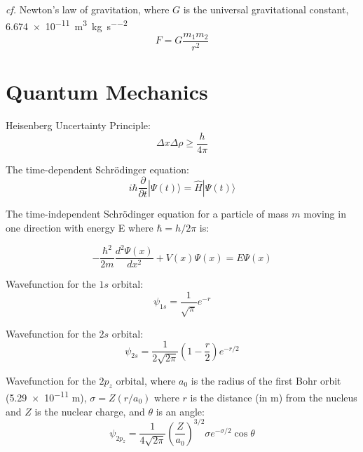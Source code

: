 \documentclass[10pt]{article}
\begin{document}
\textit{cf.} Newton's law of gravitation, where $G$ is the universal gravitational constant, \num{6.674e-11}~\si{\cubic\meter\per\kg\per\second\squared}
\begin{equation*}
F = G\frac{m_1m_2}{r^2}
\end{equation*}

\newpage
\section{Quantum Mechanics}

Heisenberg Uncertainty Principle:
\begin{equation*}
\Delta x \Delta\rho \ge \frac{h}{4\pi}
\end{equation*}

The time-dependent Schr\"odinger equation:
\begin{equation*}
i\hbar\frac{\partial}{\partial t}|\Psi(t)\rangle = \hat{H}|\Psi(t)\rangle
\end{equation*}

The time-independent Schr\"odinger equation for a particle of mass $m$ moving in one direction with energy E where $\hbar=h/2\pi$ is:

\begin{equation*}
-\frac{\hbar^2}{2m}\frac{d^2\Psi(x)}{dx^2}+V(x)\Psi(x)=E\Psi(x)
\end{equation*}

Wavefunction for the $1s$ orbital:
\begin{equation*}
\psi_{1s} = \frac{1}{\sqrt{\pi}}e^{-r}
\end{equation*}

Wavefunction for the $2s$ orbital:
\begin{equation*}
\psi_{2s} = \frac{1}{2\sqrt{2\pi}}\left(1-\frac{r}{2}\right)e^{-r/2}
\end{equation*}

Wavefunction for the $2p_z$ orbital, where $a_0$ is the radius of the first Bohr orbit (\num{5.29e-11} m), $\sigma = Z(r/a_0)$ 
where $r$ is the distance (in m) from the nucleus and $Z$ is the nuclear charge, and $\theta$ is an angle:
\begin{equation*}
\psi_{2p_z} = \frac{1}{4\sqrt{2\pi}}\left(\frac{Z}{a_0}\right)^{3/2}\sigma e^{-\sigma/2}\cos\theta
\end{equation*}
\end{document}
